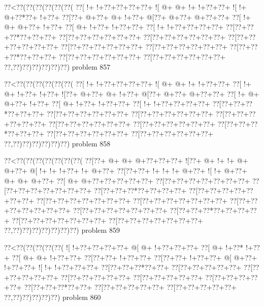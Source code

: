 \vbox{\vbox{\goo
\0??<\0??(\0??(\0??(\0??(\0??(\0??(
\0??[\- !+\- !+\0??+\0??+\0??+\0??+
\- ![\- @+\- @+\- !+\- !+\0??+\0??+
\- ![\- !+\- @+\0??*\0??+\- !+\0??+
\0??[\0??+\- @+\0??+\- @+\- !+\0??+
\- @[\0??+\- @+\0??+\- @+\0??+\0??+
\0??[\- !+\- @+\- @+\0??+\- !+\0??+
\0??[\- @+\- !+\0??+\- !+\0??+\0??+
\0??[\- !+\- !+\0??+\0??+\0??+\0??+
\0??[\0??+\0??+\0??*\0??+\0??+\0??+
\0??[\0??+\0??+\0??+\0??+\0??+\0??+
\0??[\0??+\0??+\0??+\0??+\0??+\0??+
\0??[\0??+\0??+\0??+\0??+\0??+\0??+
\0??[\0??+\0??+\0??+\0??+\0??+\0??+
\0??[\0??+\0??+\0??+\0??+\0??+\0??+
\0??[\0??+\0??+\0??*\0??+\0??+\0??+
\0??[\0??+\0??+\0??+\0??+\0??+\0??+
\0??[\0??+\0??+\0??+\0??+\0??+\0??+
\0??,\0??)\0??)\0??)\0??)\0??)\0??)
}
\hfil problem 857\hfil\break
}

\vbox{\vbox{\goo
\0??<\0??(\0??(\0??(\0??(\0??(\0??(
\0??[\- !+\- !+\0??+\0??+\0??+\0??+
\- ![\- @+\- @+\- !+\- !+\0??+\0??+
\0??[\- !+\- @+\- !+\0??+\- !+\0??+
\- ![\0??+\- @+\0??+\- @+\- !+\0??+
\- @[\0??+\- @+\0??+\- @+\0??+\0??+
\0??[\- !+\- @+\- @+\0??+\- !+\0??+
\0??[\- @+\- !+\0??+\- !+\0??+\0??+
\0??[\- !+\- !+\0??+\0??+\0??+\0??+
\0??[\0??+\0??+\0??*\0??+\0??+\0??+
\0??[\0??+\0??+\0??+\0??+\0??+\0??+
\0??[\0??+\0??+\0??+\0??+\0??+\0??+
\0??[\0??+\0??+\0??+\0??+\0??+\0??+
\0??[\0??+\0??+\0??+\0??+\0??+\0??+
\0??[\0??+\0??+\0??+\0??+\0??+\0??+
\0??[\0??+\0??+\0??*\0??+\0??+\0??+
\0??[\0??+\0??+\0??+\0??+\0??+\0??+
\0??[\0??+\0??+\0??+\0??+\0??+\0??+
\0??,\0??)\0??)\0??)\0??)\0??)\0??)
}
\hfil problem 858\hfil\break
}

\vbox{\vbox{\goo
\0??<\0??(\0??(\0??(\0??(\0??(\0??(\0??(
\0??[\0??+\- @+\- @+\- @+\0??+\0??+\0??+
\- ![\0??+\- @+\- !+\- !+\- @+\- @+\0??+
\- @[\- !+\- !+\- !+\0??+\- !+\- @+\0??+
\0??[\0??+\0??+\- !+\- !+\- !+\- @+\0??+
\- ![\- !+\- @+\0??+\- @+\- @+\- @+\0??+
\0??[\- @+\- @+\0??+\0??+\0??+\0??+\0??+
\0??[\0??+\0??+\0??+\0??+\0??+\0??+\0??+
\0??[\0??+\0??+\0??+\0??+\0??+\0??+\0??+
\0??[\0??+\0??+\0??*\0??+\0??+\0??+\0??+
\0??[\0??+\0??+\0??+\0??+\0??+\0??+\0??+
\0??[\0??+\0??+\0??+\0??+\0??+\0??+\0??+
\0??[\0??+\0??+\0??+\0??+\0??+\0??+\0??+
\0??[\0??+\0??+\0??+\0??+\0??+\0??+\0??+
\0??[\0??+\0??+\0??+\0??+\0??+\0??+\0??+
\0??[\0??+\0??+\0??*\0??+\0??+\0??+\0??+
\0??[\0??+\0??+\0??+\0??+\0??+\0??+\0??+
\0??[\0??+\0??+\0??+\0??+\0??+\0??+\0??+
\0??,\0??)\0??)\0??)\0??)\0??)\0??)\0??)
}
\hfil problem 859\hfil\break
}

\vbox{\vbox{\goo
\0??<\0??(\0??(\0??(\0??(\0??(
\- ![\- !+\0??+\0??+\0??+\0??+
\- @[\- @+\- !+\0??+\0??+\0??+
\0??[\- @+\- !+\0??*\- !+\0??+
\0??[\- @+\- @+\- !+\0??+\0??+
\0??[\0??+\0??+\- !+\0??+\0??+
\0??[\0??+\0??+\- !+\0??+\0??+
\- @[\- @+\0??+\- !+\0??+\0??+
\- ![\- !+\- !+\0??+\0??+\0??+
\0??[\0??+\0??+\0??*\0??+\0??+
\0??[\0??+\0??+\0??+\0??+\0??+
\0??[\0??+\0??+\0??+\0??+\0??+
\0??[\0??+\0??+\0??+\0??+\0??+
\0??[\0??+\0??+\0??+\0??+\0??+
\0??[\0??+\0??+\0??+\0??+\0??+
\0??[\0??+\0??+\0??*\0??+\0??+
\0??[\0??+\0??+\0??+\0??+\0??+
\0??[\0??+\0??+\0??+\0??+\0??+
\0??,\0??)\0??)\0??)\0??)\0??)
}
\hfil problem 860\hfil\break
}

